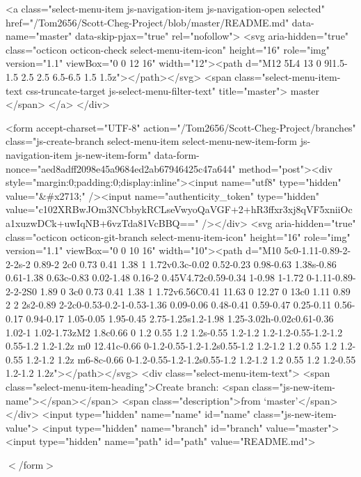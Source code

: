 \begin{DoxyVerb}        <a class="select-menu-item js-navigation-item js-navigation-open selected"
           href="/Tom2656/Scott-Cheg-Project/blob/master/README.md"
           data-name="master"
           data-skip-pjax="true"
           rel="nofollow">
          <svg aria-hidden="true" class="octicon octicon-check select-menu-item-icon" height="16" role="img" version="1.1" viewBox="0 0 12 16" width="12"><path d="M12 5L4 13 0 9l1.5-1.5 2.5 2.5 6.5-6.5 1.5 1.5z"></path></svg>
          <span class="select-menu-item-text css-truncate-target js-select-menu-filter-text" title="master">
            master
          </span>
        </a>
    </div>

      <form accept-charset="UTF-8" action="/Tom2656/Scott-Cheg-Project/branches" class="js-create-branch select-menu-item select-menu-new-item-form js-navigation-item js-new-item-form" data-form-nonce="aed8adff2098e45a9684ed2ab67946425c47a644" method="post"><div style="margin:0;padding:0;display:inline"><input name="utf8" type="hidden" value="&#x2713;" /><input name="authenticity_token" type="hidden" value="c102XRBwJOm3NCbbykRCLseVwyoQaVGF+2+hR3ffxr3xj8qVF5xniiOca1xuzwDCk+uwIqNB+6vzTda81VcBBQ==" /></div>
      <svg aria-hidden="true" class="octicon octicon-git-branch select-menu-item-icon" height="16" role="img" version="1.1" viewBox="0 0 10 16" width="10"><path d="M10 5c0-1.11-0.89-2-2-2s-2 0.89-2 2c0 0.73 0.41 1.38 1 1.72v0.3c-0.02 0.52-0.23 0.98-0.63 1.38s-0.86 0.61-1.38 0.63c-0.83 0.02-1.48 0.16-2 0.45V4.72c0.59-0.34 1-0.98 1-1.72 0-1.11-0.89-2-2-2S0 1.89 0 3c0 0.73 0.41 1.38 1 1.72v6.56C0.41 11.63 0 12.27 0 13c0 1.11 0.89 2 2 2s2-0.89 2-2c0-0.53-0.2-1-0.53-1.36 0.09-0.06 0.48-0.41 0.59-0.47 0.25-0.11 0.56-0.17 0.94-0.17 1.05-0.05 1.95-0.45 2.75-1.25s1.2-1.98 1.25-3.02h-0.02c0.61-0.36 1.02-1 1.02-1.73zM2 1.8c0.66 0 1.2 0.55 1.2 1.2s-0.55 1.2-1.2 1.2-1.2-0.55-1.2-1.2 0.55-1.2 1.2-1.2z m0 12.41c-0.66 0-1.2-0.55-1.2-1.2s0.55-1.2 1.2-1.2 1.2 0.55 1.2 1.2-0.55 1.2-1.2 1.2z m6-8c-0.66 0-1.2-0.55-1.2-1.2s0.55-1.2 1.2-1.2 1.2 0.55 1.2 1.2-0.55 1.2-1.2 1.2z"></path></svg>
        <div class="select-menu-item-text">
          <span class="select-menu-item-heading">Create branch: <span class="js-new-item-name"></span></span>
          <span class="description">from ‘master’</span>
        </div>
        <input type="hidden" name="name" id="name" class="js-new-item-value">
        <input type="hidden" name="branch" id="branch" value="master">
        <input type="hidden" name="path" id="path" value="README.md">
\end{DoxyVerb}
 $<$/form$>$ 

